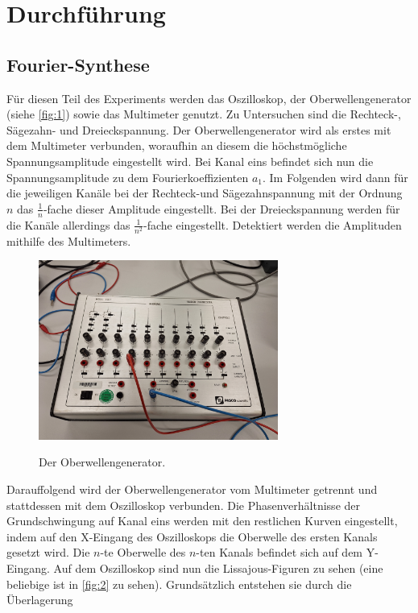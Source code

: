 \section{Durchführung}
\label{sec:Durchführung}

\subsection{Fourier-Synthese}
Für diesen Teil des Experiments werden das Oszilloskop, der Oberwellengenerator
(siehe \autoref{fig:1}) sowie das Multimeter genutzt. Zu Untersuchen sind die
Rechteck-, Sägezahn- und Dreieckspannung.
Der Oberwellengenerator wird als erstes mit dem 
Multimeter verbunden, woraufhin an diesem die höchstmögliche Spannungsamplitude 
eingestellt wird. Bei Kanal eins befindet sich nun die Spannungsamplitude zu
dem Fourierkoeffizienten $a_1$. Im Folgenden wird dann für die jeweiligen Kanäle 
bei der Rechteck-und Sägezahnspannung mit der Ordnung $n$ das $\frac{1}{n}$-fache
dieser Amplitude eingestellt. Bei der Dreieckspannung werden für die Kanäle 
allerdings das $\frac{1}{n^2}$-fache eingestellt. Detektiert werden die Amplituden 
mithilfe des Multimeters.
\begin{figure}
    \caption{Der Oberwellengenerator.}
    \centering
    \includegraphics[width=0.7\textwidth]{"Bilder/owg.jpg"}
    \label{fig:1}
\end{figure}
Darauffolgend wird der Oberwellengenerator vom Multimeter getrennt und 
stattdessen mit dem Oszilloskop verbunden. Die Phasenverhältnisse der 
Grundschwingung auf Kanal eins werden mit den restlichen Kurven eingestellt, 
indem auf den X-Eingang des Oszilloskops die Oberwelle des ersten Kanals gesetzt 
wird. Die $n$-te Oberwelle des $n$-ten Kanals befindet sich auf dem Y-Eingang.
Auf dem Oszilloskop sind nun die Lissajous-Figuren zu sehen (eine beliebige ist 
in \autoref{fig:2} zu sehen). Grundsätzlich entstehen sie durch die Überlagerung 
